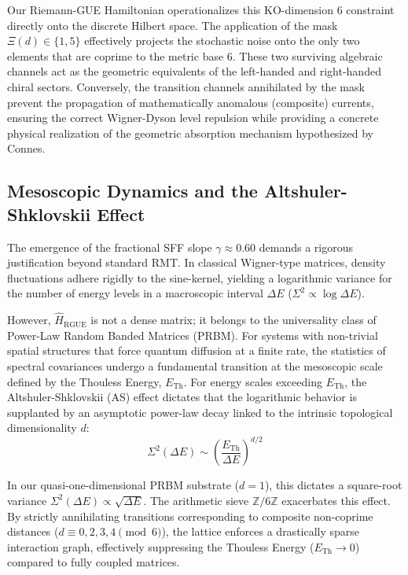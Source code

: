 \documentclass[aps,prl,preprint,superscriptaddress,floatfix]{revtex4-2}
\newcommand{\Zmod}{\mathbb{Z}/6\mathbb{Z}}
\begin{document}
Our Riemann-GUE Hamiltonian operationalizes this KO-dimension 6 constraint directly onto the discrete Hilbert space. The application of the mask $\Xi(d) \in \{1,5\}$ effectively projects the stochastic noise onto the only two elements that are coprime to the metric base 6. These two surviving algebraic channels act as the geometric equivalents of the left-handed and right-handed chiral sectors. Conversely, the transition channels annihilated by the mask prevent the propagation of mathematically anomalous (composite) currents, ensuring the correct Wigner-Dyson level repulsion while providing a concrete physical realization of the geometric absorption mechanism hypothesized by Connes.

\subsection{Mesoscopic Dynamics and the Altshuler-Shklovskii Effect}

The emergence of the fractional SFF slope $\gamma \approx 0.60$ demands a rigorous justification beyond standard RMT. In classical Wigner-type matrices, density fluctuations adhere rigidly to the sine-kernel, yielding a logarithmic variance for the number of energy levels in a macroscopic interval $\Delta E$ ($\Sigma^2 \propto \log \Delta E$).

However, $\hat{H}_{\text{RGUE}}$ is not a dense matrix; it belongs to the universality class of Power-Law Random Banded Matrices (PRBM). For systems with non-trivial spatial structures that force quantum diffusion at a finite rate, the statistics of spectral covariances undergo a fundamental transition at the mesoscopic scale defined by the Thouless Energy, $E_{\text{Th}}$. For energy scales exceeding $E_{\text{Th}}$, the Altshuler-Shklovskii (AS) effect dictates that the logarithmic behavior is supplanted by an asymptotic power-law decay linked to the intrinsic topological dimensionality $d$:
\begin{equation}
\Sigma^2(\Delta E) \sim \left( \frac{E_{\text{Th}}}{\Delta E} \right)^{d/2}
\end{equation}

In our quasi-one-dimensional PRBM substrate ($d=1$), this dictates a square-root variance $\Sigma^2(\Delta E) \propto \sqrt{\Delta E}$. The arithmetic sieve $\Zmod$ exacerbates this effect. By strictly annihilating transitions corresponding to composite non-coprime distances ($d \equiv 0,2,3,4 \pmod 6$), the lattice enforces a drastically sparse interaction graph, effectively suppressing the Thouless Energy ($E_{\text{Th}} \to 0$) compared to fully coupled matrices.
\end{document}
